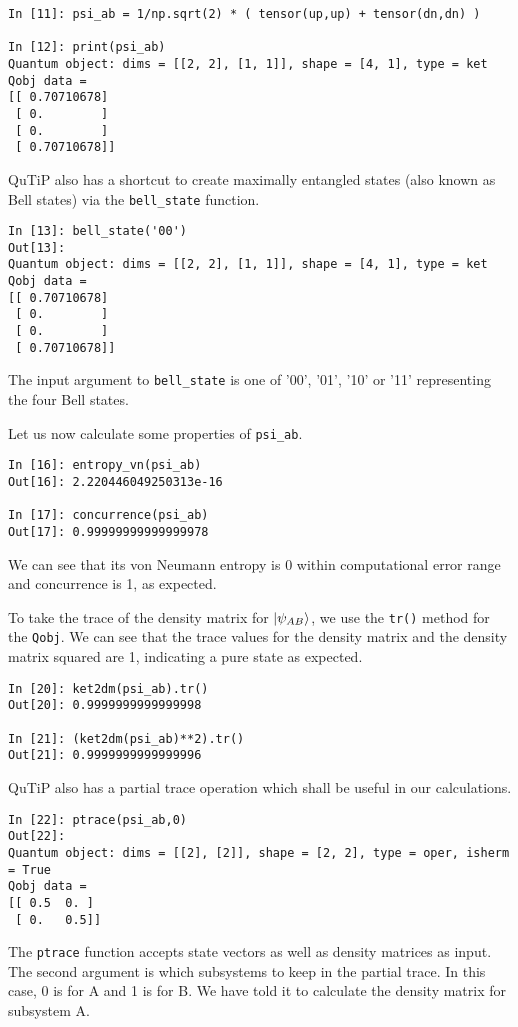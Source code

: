 \begin{verbatim}
In [11]: psi_ab = 1/np.sqrt(2) * ( tensor(up,up) + tensor(dn,dn) )

In [12]: print(psi_ab)
Quantum object: dims = [[2, 2], [1, 1]], shape = [4, 1], type = ket
Qobj data =
[[ 0.70710678]
 [ 0.        ]
 [ 0.        ]
 [ 0.70710678]]
\end{verbatim}
\par QuTiP also has a shortcut to create maximally entangled states (also known as Bell states) via the \texttt{bell\_state} function.
\begin{verbatim}
In [13]: bell_state('00')
Out[13]: 
Quantum object: dims = [[2, 2], [1, 1]], shape = [4, 1], type = ket
Qobj data =
[[ 0.70710678]
 [ 0.        ]
 [ 0.        ]
 [ 0.70710678]]
\end{verbatim}
The input argument to \texttt{bell\_state} is one of '00', '01', '10' or '11' representing the four Bell states.
\par Let us now calculate some properties of \texttt{psi\_ab}.
\begin{verbatim}
In [16]: entropy_vn(psi_ab)
Out[16]: 2.220446049250313e-16

In [17]: concurrence(psi_ab)
Out[17]: 0.99999999999999978
\end{verbatim}
We can see that its von Neumann entropy is 0 within computational error range and concurrence is 1, as expected.
\par To take the trace of the density matrix for $\ket{\psi_{AB}}$, we use the \texttt{tr()} method for the \texttt{Qobj}. We can see that the trace values for the density matrix and the density matrix squared are 1, indicating a pure state as expected.
\begin{verbatim}
In [20]: ket2dm(psi_ab).tr()
Out[20]: 0.9999999999999998

In [21]: (ket2dm(psi_ab)**2).tr()
Out[21]: 0.9999999999999996
\end{verbatim}
\par QuTiP also has a partial trace operation which shall be useful in our calculations.
\begin{verbatim}
In [22]: ptrace(psi_ab,0)
Out[22]: 
Quantum object: dims = [[2], [2]], shape = [2, 2], type = oper, isherm = True
Qobj data =
[[ 0.5  0. ]
 [ 0.   0.5]]
\end{verbatim}
The \texttt{ptrace} function accepts state vectors as well as density matrices as input. The second argument is which subsystems to keep in the partial trace. In this case, 0 is for A and 1 is for B. We have told it to calculate the density matrix for subsystem A.
